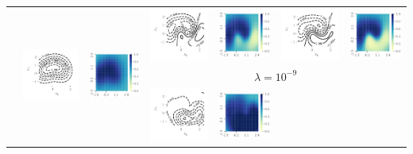\documentclass{article}
\theoremstyle{definition}
\begin{document}
\begin{table}
\begin{tabular}{@{}c@{}c@{}c@{}c@{}c@{}c@{}c@{}}
{}
&
\multirow[t]{4}{*}{
    \includegraphics[trim={7mm 8mm 3mm 3mm}, clip,height=0.13\textwidth]{img/moon/moon_rm_50_remain_meanf.pdf}
}
&
\multirow[t]{4}{*}{
    \includegraphics[height=0.13\textwidth]{img/moon/moon_rm_50_remain_prob.pdf}
}
&
\includegraphics[trim={7mm 8mm 3mm 3mm}, clip,height=0.13\textwidth]{img/moon/moon_rm_50_eubo_meanf_1e-09.pdf}
&
\includegraphics[height=0.13\textwidth]{img/moon/moon_rm_50_eubo_prob_1e-09.pdf}
&
\includegraphics[trim={7mm 8mm 3mm 3mm}, clip,height=0.13\textwidth]{img/moon/moon_rm_50_elbo_meanf_1e-09.pdf}
&
\includegraphics[height=0.13\textwidth]{img/moon/moon_rm_50_elbo_prob_1e-09.pdf}
\\
& & &
\multicolumn{4}{c}{$\lambda = 10^{-9}$}
\\
& & &
\includegraphics[trim={7mm 8mm 3mm 3mm}, clip,height=0.13\textwidth]{img/moon/moon_rm_50_eubo_meanf_0_0.pdf}
&
\includegraphics[height=0.13\textwidth]{img/moon/moon_rm_50_eubo_prob_0_0.pdf}

\end{tabular}
\end{table}
\end{document}
